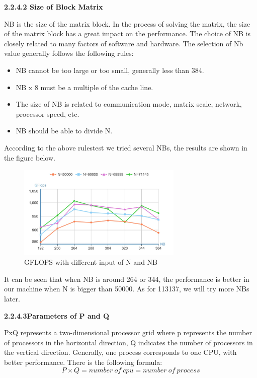 \documentclass[a4paper,12pt]{article}
\begin{document}
\textbf{2.2.4.2 Size of Block Matrix}

NB is the size of the matrix block. In the process of solving the matrix, the size of the matrix block has a great impact on the performance. The choice of NB is closely related to many factors of software and hardware. The selection of Nb value generally follows the following rules:
\begin{itemize}
    \item NB cannot be too large or too small, generally less than 384.
    \item NB x 8 must be a multiple of the cache line.
    \item The size of NB is related to communication mode, matrix scale, network, processor speed, etc.
    \item NB should be able to divide N.
\end{itemize}

According to the above rulestest we tried several NBs, the results are shown in the figure below.

\begin{figure}[H]
    \centering
    \includegraphics[width=0.7\textwidth]{GFLOPS_NB.png}
    \caption{GFLOPS with different input of N and NB}
    \label{fig:gflops_nb}
\end{figure}

It can be seen that when NB is around 264 or 344, the performance is better in our machine when N is bigger than 50000. As for 113137, we will try more NBs later.

\textbf{2.2.4.3Parameters of P and Q}

PxQ represents a two-dimensional processor grid where p represents the number of processors in the horizontal direction, Q indicates the number of processors in the vertical direction. Generally, one process corresponds to one CPU, with better performance. There is the following formula:
\begin{equation*}
P \times Q = number\ of\ cpu = number\ of\ process
\end{equation*}
\end{document}
